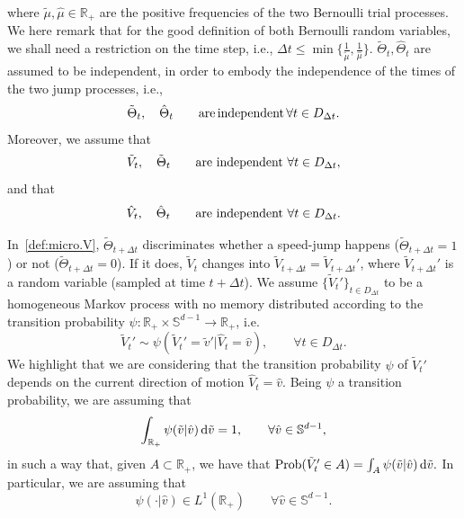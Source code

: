 \documentclass[a4paper]{article}
\theoremstyle{Theorem}\newtheorem{proposition}{Proposition}[section]
\theoremstyle{Remark}\newtheorem{remark}{Remark}[section]
\theoremstyle{Theorem}\newtheorem{theorem}{Theorem}[section]
\newcommand{\R}{\mathbb{R}}
\newcommand{\hv}{\hat{v}}
\newcommand{\tv}{\tilde{v}}
\newcommand{\hV}{\hat{V}}
\newcommand{\tV}{\tilde{V}}
\newcommand{\hmu}{\hat{\mu}}
\newcommand{\tmu}{\tilde{\mu}}
\newcommand{\intR}{\int_{\R_+}}
\begin{document}
where $\tmu, \hmu\in \R_{+}$ are the positive frequencies of the two Bernoulli trial processes. We here remark that for the good definition of both Bernoulli random variables, we shall need a restriction on the time step, i.e., $\Delta t \le \min \lbrace \frac{1}{\tmu}, \frac{1}{\hmu}\rbrace$.
$\tilde{\Theta}_t, \hat{\Theta}_t$ are assumed to be independent, in order to embody the independence of the times of the two jump processes, i.e., 
\begin{equation}\label{ass:indep1}
\tilde{\Theta}_t, \quad \hat{\Theta}_t \qquad {\rm are} \, {\rm independent} \, \forall t \in D_{\Delta t}.
\end{equation}
Moreover, we assume that
\begin{equation}\label{ass:indep2}
\tV_t, \quad \tilde{\Theta}_t \qquad {\rm are} \,\, {\rm independent} \,\, \forall t \in D_{\Delta t},
\end{equation}
and that
\begin{equation}\label{ass:indep3}
\hV_t, \quad \hat{\Theta}_t \qquad {\rm are} \,\, {\rm independent} \,\, \forall t \in D_{\Delta t}.
\end{equation}


In~\eqref{def:micro.V}, $\tilde{\Theta}_{t+\Delta t}$ discriminates whether a speed-jump happens ($\tilde{\Theta}_{t+\Delta t}=1$) or not ($\tilde{\Theta}_{t+\Delta t}=0$). If it does, $\tV_{t}$ changes into $\tV_{t+\Delta t}=\tV_{t+\Delta t}'$, where $\tV_{t+\Delta t}'$ is a random variable (sampled at time $t+\Delta t$). We assume $\lbrace\tV_{t}'\rbrace_{t\in D_{\Delta t}}$ to be a homogeneous Markov process with no memory distributed according to the transition probability $\psi: \R_+ \times \mathbb{S}^{d-1}\to \R_+$, i.e.
\begin{equation}\label{def:psi}
 \tV_t' \sim \psi( \tV_t'=\tv'|\hV_t=\hv), \qquad \forall t \in D_{\Delta t}.
\end{equation}
We highlight that we are considering that the transition probability $\psi$ of $ \tV_t'$ depends on the current direction of motion $\hV_t=\hv$. 
Being $\psi$ a transition probability, we are assuming that
\begin{equation}\label{norm.psi}
\intR \psi(\tv|\hv) \, {\rm d}\tv =1, \qquad \forall \hv \in \mathbb{S}^{d-1},
\end{equation}
in such a way that, given $A \subset\R_+$, we have that ${\rm Prob}( \tV_t'\in A)= \int_A \psi(\tv|\hv) \, {\rm d}\tv.$
In particular, we are assuming that
\begin{equation}\label{psi.L1}
    \psi(\cdot|\hv) \in L^1(\R_+) \qquad \forall \hv \in \mathbb{S}^{d-1}.
\end{equation}
 
\end{document}
